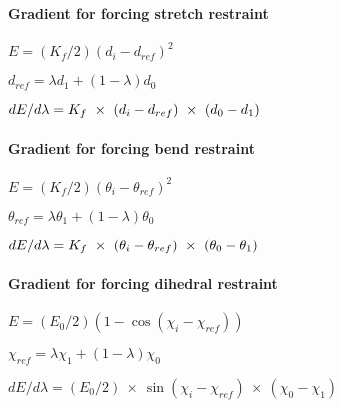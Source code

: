 \paragraph*{Gradient for forcing stretch restraint}

$E=\left( K_{f}/2\right) \left( d_{i}-d_{ref}\right) ^{2}$

$d_{ref}=\lambda d_{1}+\left( 1-\lambda \right) d_{0}$

$dE/d\lambda =K_{f}~\times ~\left( d_{i}-d_{ref}\right) ~\times ~\left(
d_{0}-d_{1}\right) \bigskip $

\paragraph*{Gradient for forcing bend restraint}

$E=\left( K_{f}/2\right) \left( \theta _{i}-\theta _{ref}\right) ^{2}$

$\theta _{ref}=\lambda \theta _{1}+\left( 1-\lambda \right) \theta _{0}$

$dE/d\lambda =K_{f}~\times ~\left( \theta _{i}-\theta _{ref}\right) ~\times %
~\left( \theta _{0}-\theta _{1}\right) \bigskip $

\paragraph*{Gradient for forcing dihedral restraint}

$E=\left( E_{0}/2\right) \left( 1-\cos \left( \chi _{i}-\chi _{ref}\right)
\right) $

$\chi _{ref}=\lambda \chi _{1}+\left( 1-\lambda \right) \chi _{0}$

$dE/d\lambda =\left( E_{0}/2\right) ~\times ~\sin \left( \chi _{i}-\chi
_{ref}\right) ~\times ~\left( \chi _{0}-\chi _{1}\right) $

